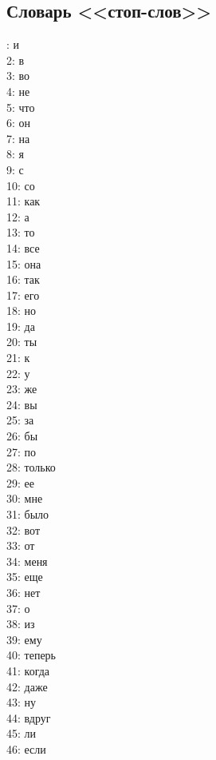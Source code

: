 \documentclass[14pt]{matmex-diploma-custom}
\begin{document}
\begin{appendices}
\section{Словарь <<стоп-слов>>}

\label{work:stop}

\begin{multicols}{5}
: и\\
2: в\\
3: во\\
4: не\\
5: что\\
6: он\\
7: на\\
8: я\\
9: с\\
10: со\\
11: как\\
12: а\\
13: то\\
14: все\\
15: она\\
16: так\\
17: его\\
18: но\\
19: да\\
20: ты\\
21: к\\
22: у\\
23: же\\
24: вы\\
25: за\\
26: бы\\
27: по\\
28: только\\
29: ее\\
30: мне\\
31: было\\
32: вот\\
33: от\\
34: меня\\
35: еще\\
36: нет\\
37: о\\
38: из\\
39: ему\\
40: теперь\\
41: когда\\
42: даже\\
43: ну\\
44: вдруг\\
45: ли\\
46: если\\

\end{multicols}
\end{appendices}
\end{document}
